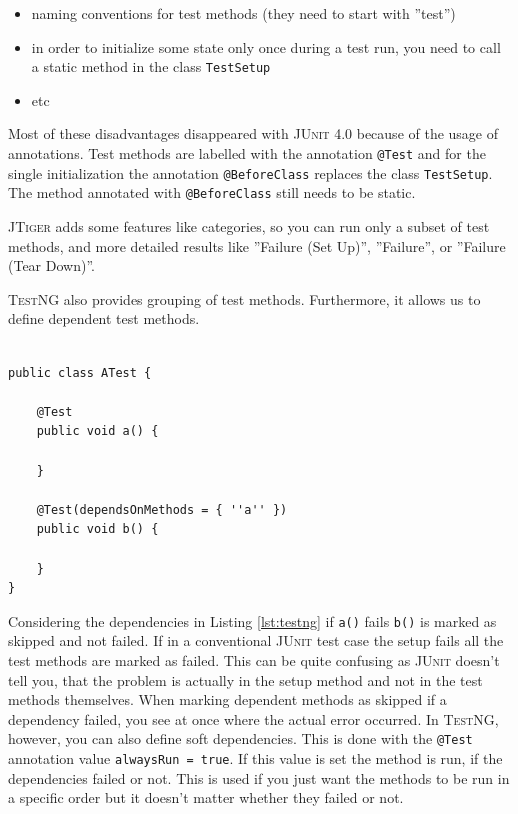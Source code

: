 \documentclass[11pt,a4paper,pdftex]{article}
\makeatletter
\newcommand{\JUnit}{\textsc{JUnit}\xspace}
\newcommand{\TestNG}{\textsc{TestNG}\xspace}
\newcommand{\JTiger}{\textsc{JTiger}\xspace}
\newcommand{\ttt}[1]{\texttt{#1}}
\newcommand{\nb}[2]{
    \fbox{\bfseries\sffamily\scriptsize#1: #2}
    }
\newcommand{\todo}[1]{\nb{TODO}{#1}}
\newcommand{\attest}{\ttt{@Test}\xspace}
\makeatother
\begin{document}
\todo{more, better disadvantages}

\begin{itemize}
 \item naming conventions for test methods (they need to start with ''test'')
 \item in order to initialize some state only once during a test run, you need to call a static method in the class \ttt{TestSetup}
 \item etc
\end{itemize}

Most of these disadvantages disappeared with \JUnit 4.0 because of the usage of annotations. Test methods are labelled with the annotation \attest and for the single initialization the annotation \ttt{@BeforeClass} replaces the class \ttt{TestSetup}. The method annotated with \ttt{@BeforeClass} still needs to be static.

\JTiger adds some features like categories, so you can run only a subset of test methods, and more detailed results like ''Failure (Set Up)'', ''Failure'', or ''Failure (Tear Down)''.

\TestNG also provides grouping of test methods. Furthermore, it allows us to define dependent test methods.

\begin{lstlisting}[label=lst:testng,caption=Dependent test methods with \TestNG.]

public class ATest {

	@Test
	public void a() {
		
	}
	
	@Test(dependsOnMethods = { ''a'' })
	public void b() {
	
	}
}

\end{lstlisting}

Considering the dependencies in Listing \ref{lst:testng} if \ttt{a()} fails \ttt{b()} is marked as skipped and not failed. If in a conventional \JUnit test case the setup fails all the test methods are marked as failed. This can be quite confusing as \JUnit doesn't tell you, that the problem is actually in the setup method and not in the test methods themselves. When marking dependent methods as skipped if a dependency failed, you see at once where the actual error occurred. In \TestNG, however, you can also define soft dependencies. This is done with the \attest annotation value \ttt{alwaysRun = true}. If this value is set the method is run, if the dependencies failed or not. This is used if you just want the methods to be run in a specific order but it doesn't matter whether they failed or not.
\end{document}

